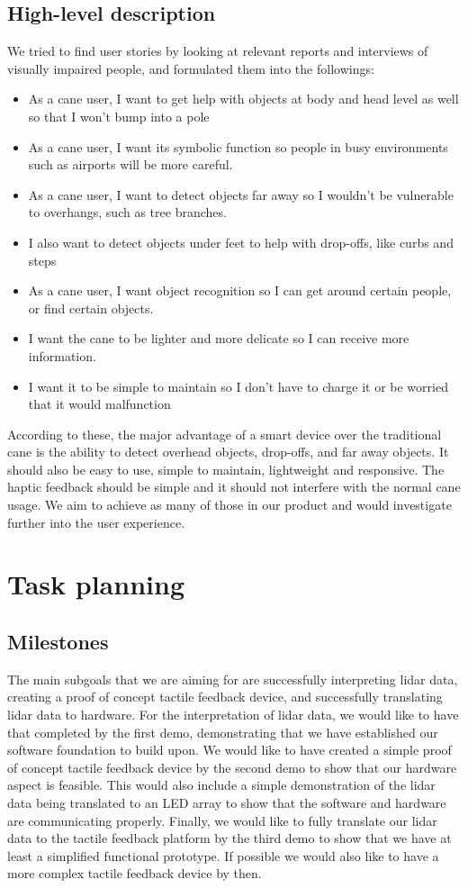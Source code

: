 \documentclass{article}
\begin{document}
\subsection{High-level description} 
We tried to find user stories by looking at relevant reports and interviews of visually impaired people, and formulated them into the followings:
\begin{itemize}
\item As a cane user, I want to get help with objects at body and head level as well so that I won't bump into a pole \cite{SmithsonianMagazine}
\item As a cane user, I want its symbolic function so people in busy environments such as airports will be more careful.\cite{dosSantos}
\item As a cane user, I want to detect objects far away so I wouldn’t be vulnerable to overhangs, such as tree branches.
\item I also want to detect objects under feet to help with drop-offs, like curbs and steps
\item As a cane user, I want object recognition so I can get around certain people, or find certain objects.
\item I want the cane to be lighter and more delicate so I can receive more information. \cite{WHYY}
\item I want it to be simple to maintain so I don’t have to charge it or be worried that it would malfunction
\end{itemize} 
According to these, the major advantage of a smart device over the traditional cane is the ability to detect overhead objects, drop-offs, and far away objects. It should also be easy to use, simple to maintain, lightweight and responsive. The haptic feedback should be simple and it should not interfere with the normal cane usage. We aim to achieve as many of those in our product and would investigate further into the user experience.
\section{Task planning}

\subsection{Milestones} 
The main subgoals that we are aiming for are successfully interpreting lidar data, creating a proof of concept tactile feedback device, and successfully translating lidar data to hardware. For the interpretation of lidar data, we would like to have that completed by the first demo, demonstrating that we have established our software foundation to build upon. We would like to have created a simple proof of concept tactile feedback device by the second demo to show that our hardware aspect is feasible. This would also include a simple demonstration of the lidar data being translated to an LED array to show that the software and hardware are communicating properly. Finally, we would like to fully translate our lidar data to the tactile feedback platform by the third demo to show that we have at least a simplified functional prototype. If possible we would also like to have a more complex tactile feedback device by then.
\end{document}
